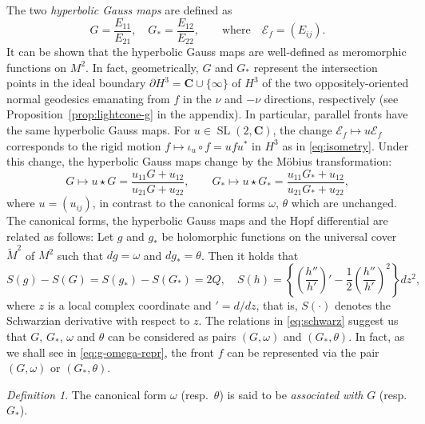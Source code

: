 \documentclass[a4paper]{amsart}
\theoremstyle{plain}
\theoremstyle{remark}
\newtheorem{definition}[theorem]{Definition}
\numberwithin{equation}{section}
\begin{document}
The two {\em hyperbolic Gauss maps\/} are defined as
\begin{equation*}
   G=\frac{E_{11}}{E_{21}}, \quad G_*=\frac{E_{12}}{E_{22}}, \qquad
 \text{where}\quad
    {\mathcal{E}}_f=(E_{ij}).
\end{equation*}
It can be shown that the hyperbolic Gauss maps are 
well-defined as meromorphic functions on $M^2$. In fact, 
geometrically, $G$ and $G_*$ represent the intersection points in the 
ideal boundary $\partial H^3 = {\boldsymbol{C}} \cup \{ \infty \}$ of $H^3$ of 
the two oppositely-oriented normal geodesics 
emanating from $f$ in the $\nu$ and $-\nu$ directions, 
respectively 
(see Proposition~\ref{prop:lightcone-g} in the appendix). 
In particular, parallel fronts have the same hyperbolic 
Gauss maps.
For $u\in{\operatorname{SL}}(2,{\boldsymbol{C}})$, 
the change ${\mathcal{E}}_f\mapsto u{\mathcal{E}}_f$ corresponds
to the rigid motion 
$f\mapsto \iota_u\circ f=ufu^*$ 
in $H^3$ as in \eqref{eq:isometry}.
Under this change, 
the hyperbolic Gauss maps change by the M\"obius transformation:
\begin{equation}\label{eq:gauss-moebius}
   G \mapsto u\star G =
    \frac{u_{11}G+u_{12}}{          u_{21}G+u_{22}},\qquad
   G_*\mapsto u\star G_*=    
    \frac{u_{11}G_*+u_{12}}{          u_{21}G_*+u_{22}},
\end{equation}
where $u=(u_{ij})$,
in contrast to the canonical forms 
$\omega$, $\theta$ which are unchanged.
The canonical forms, the hyperbolic Gauss maps 
and the Hopf differential are related as follows:
Let $g$ and $g_*$ be holomorphic functions on the universal cover
$\widetilde M^2$ of $M^2$ such that $dg=\omega$ and $dg_*=\theta$.
Then it holds that
\begin{equation}\label{eq:schwarz}
  S(g)-S(G) = S(g_*)-S(G_*) = 2Q,\quad
   S(h) = \left\{
   \left(\frac{h''}{h'}\right)'-\frac{1}{2}\left(\frac{h''}{h'}\right)^2
   \right\}dz^2,
\end{equation}
where $z$ is a local complex coordinate and $'=d/dz$, that is, $S(\cdot)$
denotes the Schwarzian derivative with respect to $z$.
The relations in \eqref{eq:schwarz} suggest us that
$G$, $G_*$, $\omega$ and $\theta$ can be considered as pairs
$(G,\omega)$ and $(G_*,\theta)$. 
In fact, as we shall see in \eqref{eq:g-omega-repr},
the front $f$ can be represented via the pair $(G,\omega)$
or $(G_*,\theta)$.
\begin{definition}\label{def:omega-theta}
 The canonical form $\omega$ (resp.\ $\theta$) 
 is said to be {\em associated with} $G$ (resp. $G_*$).
\end{definition}
\end{document}
